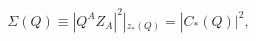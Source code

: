 \begin{equation} \label{Fdef}
 \Sigma(Q) \equiv |Q^A Z_A|^2 |_{z_*(Q)} = |C_*(Q)|^2,
\end{equation}

